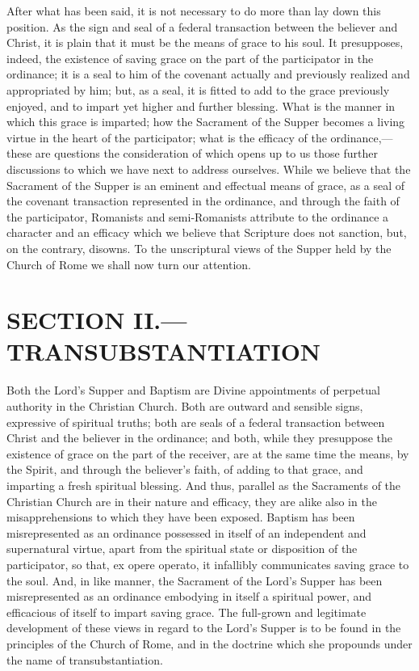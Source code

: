 \documentclass[]{book}
\begin{document}
After what has been said, it is not necessary to do more than lay down this position. As the sign and seal of a federal transaction between the believer and Christ, it is plain that it must be the means of grace to his soul. It presupposes, indeed, the existence of saving grace on the part of the participator in the ordinance; it is a seal to him of the covenant actually and previously realized and appropriated by him; but, as a seal, it is fitted to add to the grace previously enjoyed, and to impart yet higher and further blessing. What is the manner in which this grace is imparted; how the Sacrament of the Supper becomes a living virtue in the heart of the participator; what is the efficacy of the ordinance,---these are questions the consideration of which opens up to us those further discussions to which we have next to address ourselves. While we believe that the Sacrament of the Supper is an eminent and effectual means of grace, as a seal of the covenant transaction represented in the ordinance, and through the faith of the participator, Romanists and semi-Romanists attribute to the ordinance a character and an efficacy which we believe that Scripture does not sanction, but, on the contrary, disowns. To the unscriptural views of the Supper held by the Church of Rome we shall now turn our attention.

\hypertarget{section-ii.transubstantiation}{%
\section{SECTION II.---TRANSUBSTANTIATION}\label{section-ii.transubstantiation}}

Both the Lord's Supper and Baptism are Divine appointments of perpetual authority in the Christian Church. Both are outward and sensible signs, expressive of spiritual truths; both are seals of a federal transaction between Christ and the believer in the ordinance; and both, while they presuppose the existence of grace on the part of the receiver, are at the same time the means, by the Spirit, and through the believer's faith, of adding to that grace, and imparting a fresh spiritual blessing. And thus, parallel as the Sacraments of the Christian Church are in their nature and efficacy, they are alike also in the misapprehensions to which they have been exposed. Baptism has been misrepresented as an ordinance possessed in itself of an independent and supernatural virtue, apart from the spiritual state or disposition of the participator, so that, ex opere operato, it infallibly communicates saving grace to the soul. And, in like manner, the Sacrament of the Lord's Supper has been misrepresented as an ordinance embodying in itself a spiritual power, and efficacious of itself to impart saving grace. The full-grown and legitimate development of these views in regard to the Lord's Supper is to be found in the principles of the Church of Rome, and in the doctrine which she propounds under the name of transubstantiation.
\end{document}
